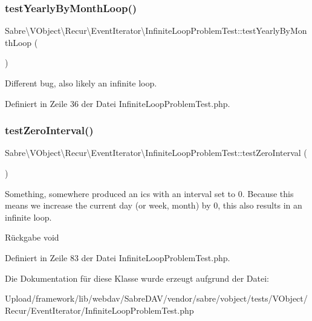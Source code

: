 \subsubsection{\texorpdfstring{test\+Yearly\+By\+Month\+Loop()}{testYearlyByMonthLoop()}}
{\footnotesize\ttfamily Sabre\textbackslash{}\+V\+Object\textbackslash{}\+Recur\textbackslash{}\+Event\+Iterator\textbackslash{}\+Infinite\+Loop\+Problem\+Test\+::test\+Yearly\+By\+Month\+Loop (\begin{DoxyParamCaption}{ }\end{DoxyParamCaption})}

Different bug, also likely an infinite loop. 

Definiert in Zeile 36 der Datei Infinite\+Loop\+Problem\+Test.\+php.

\mbox{\label{class_sabre_1_1_v_object_1_1_recur_1_1_event_iterator_1_1_infinite_loop_problem_test_aa7464632a9bae573989a8af3caacf0b4}} 
\subsubsection{\texorpdfstring{test\+Zero\+Interval()}{testZeroInterval()}}
{\footnotesize\ttfamily Sabre\textbackslash{}\+V\+Object\textbackslash{}\+Recur\textbackslash{}\+Event\+Iterator\textbackslash{}\+Infinite\+Loop\+Problem\+Test\+::test\+Zero\+Interval (\begin{DoxyParamCaption}{ }\end{DoxyParamCaption})}

Something, somewhere produced an ics with an interval set to 0. Because this means we increase the current day (or week, month) by 0, this also results in an infinite loop.

\begin{DoxyReturn}{Rückgabe}
void 
\end{DoxyReturn}


Definiert in Zeile 83 der Datei Infinite\+Loop\+Problem\+Test.\+php.



Die Dokumentation für diese Klasse wurde erzeugt aufgrund der Datei\+:\begin{DoxyCompactItemize}
\item 
Upload/framework/lib/webdav/\+Sabre\+D\+A\+V/vendor/sabre/vobject/tests/\+V\+Object/\+Recur/\+Event\+Iterator/Infinite\+Loop\+Problem\+Test.\+php\end{DoxyCompactItemize}
